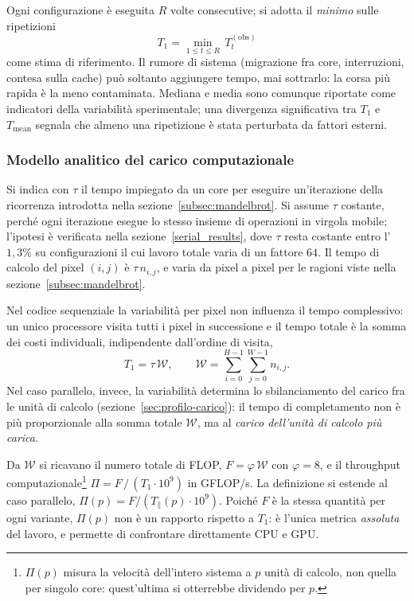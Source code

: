 Ogni configurazione è eseguita $R$ volte consecutive; si adotta il
\emph{minimo} sulle ripetizioni
%
\begin{equation}
    T_1 = \min_{1 \le t \le R}\, T_t^{(\mathrm{obs})}
    \label{eq:T1}
\end{equation}
%
come stima di riferimento. Il rumore di sistema (migrazione fra core,
interruzioni, contesa sulla cache) può soltanto aggiungere tempo, mai sottrarlo:
la corsa più rapida è la meno contaminata. Mediana e media sono comunque
riportate come indicatori della variabilità sperimentale; una divergenza
significativa tra $T_1$ e $T_\mathrm{mean}$ segnala che almeno una ripetizione è
stata perturbata da fattori esterni.

\subsubsection{Modello analitico del carico computazionale}
\label{sec:lavoro}

Si indica con $\tau$ il tempo impiegato da un core per eseguire un'iterazione
della ricorrenza introdotta nella sezione~\ref{subsec:mandelbrot}. Si assume
$\tau$ costante, perché ogni iterazione esegue lo stesso insieme di operazioni
in virgola mobile; l'ipotesi è verificata nella sezione~\ref{serial_results},
dove $\tau$ resta costante entro l'$1{,}3\%$ su configurazioni il cui lavoro
totale varia di un fattore $64$. Il tempo di calcolo del pixel $(i,j)$ è
$\tau\,n_{i,j}$, e varia da pixel a pixel per le ragioni viste nella
sezione~\ref{subsec:mandelbrot}.

Nel codice sequenziale la variabilità per pixel non influenza il tempo
complessivo: un unico processore visita tutti i pixel in successione e il tempo
totale è la somma dei costi individuali, indipendente dall'ordine di visita,
%
\begin{equation}
    T_1 = \tau\,\mathcal{W},
    \qquad
    \mathcal{W} = \sum_{i=0}^{H-1}\sum_{j=0}^{W-1} n_{i,j}.
    \label{eq:lavoro}
\end{equation}
%
Nel caso parallelo, invece, la variabilità determina lo sbilanciamento del
carico fra le unità di calcolo (sezione~\ref{sec:profilo-carico}): il tempo di
completamento non è più proporzionale alla somma totale $\mathcal{W}$, ma al
\textit{carico dell'unità di calcolo più carica}.

Da $\mathcal{W}$ si ricavano il numero totale di FLOP, $F = \varphi\,\mathcal{W}$
con $\varphi = 8$, e il throughput computazionale\footnote{$\Pi(p)$ misura la
velocità dell'intero sistema a $p$ unità di calcolo, non quella per singolo
core: quest'ultima si otterrebbe dividendo per $p$.}
$\Pi = F\,/\,(T_1 \cdot 10^{9})$ in GFLOP/s. La definizione si estende al caso
parallelo, $\Pi(p) = F/(T_\parallel(p)\cdot10^9)$. Poiché $F$ è la stessa
quantità per ogni variante, $\Pi(p)$ non è un rapporto rispetto a $T_1$: è
l'unica metrica \emph{assoluta} del lavoro, e permette di confrontare
direttamente CPU e GPU.


